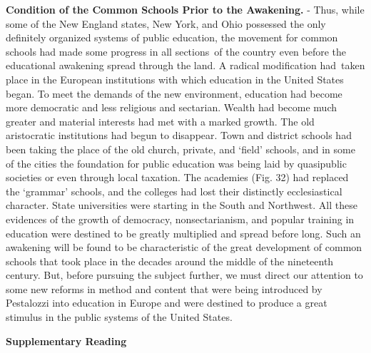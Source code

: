 \documentclass[
]{book}
\begin{document}
\textbf{Condition of the Common Schools Prior to the Awakening.} - Thus, while some of the New England states, New York, and Ohio possessed the only definitely organized systems of public education, the movement for common schools had made some progress in all sections~of the country even before the educational awakening spread through the land. A radical modification had~taken place in the European institutions with which education in the United States began. To meet the demands of the new environment, education had become more democratic and less religious and sectarian. Wealth had become much greater and material interests had met with a marked growth. The old aristocratic institutions had begun to disappear. Town and district schools had been taking the place of the old church, private, and `field' schools, and in some of the cities the foundation for public education was being laid by quasipublic societies or even through local taxation. The academies (Fig. 32) had replaced the `grammar' schools, and the colleges had lost their distinctly ecclesiastical character. State universities were starting in the South and Northwest. All these evidences of the growth of democracy, nonsectarianism, and popular training in education were destined to be greatly multiplied and spread before long. Such an awakening will be found to be characteristic of the great development of common schools that took place in the decades around the middle of the nineteenth century. But, before pursuing the subject further, we must direct our attention to some new reforms in method and content that were being introduced by Pestalozzi into education in Europe and were destined to produce a great stimulus in the public systems of the United States.

\textbf{Supplementary Reading}
\end{document}
